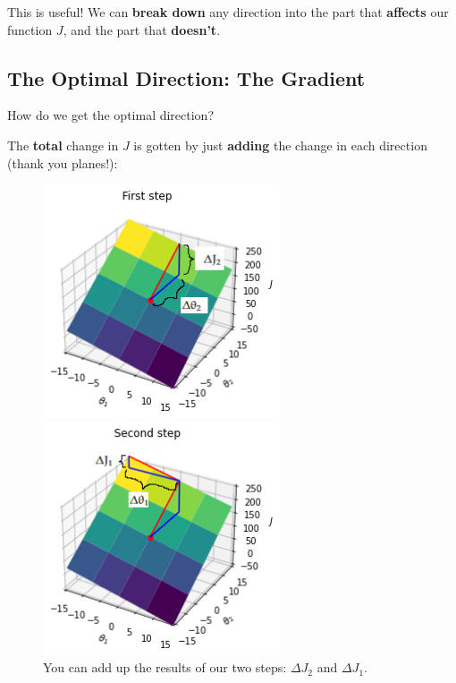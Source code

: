         This is useful! We can \textbf{break down} any direction into the part that \textbf{affects} our function $J$, and the part that \textbf{doesn't}.
        
        
    
    \subsection{The Optimal Direction: The Gradient}
    
        How do we get the optimal direction?
        
        The \textbf{total} change in $J$ is gotten by just \textbf{adding} the change in each direction (thank you planes!):
        
        \begin{figure}[H]
        
                \includegraphics[width=70mm,scale=0.5]{images/gradient_descent_images/first_step.png}
                
                \includegraphics[width=70mm,scale=0.5]{images/gradient_descent_images/second_step.png}
                
            \caption*{You can add up the results of our two steps: $\Delta J_2$ and $\Delta J_1$.}
        \end{figure}
        
